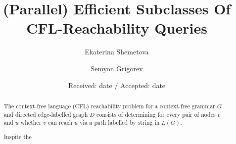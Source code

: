 \documentclass[smallextended]{svjour3}       %
\begin{document}
\title{(Parallel) Efficient Subclasses Of CFL-Reachability Queries%
}


\author{Ekaterina Shemetova         \and
        Semyon Grigorev %
}



\date{Received: date / Accepted: date}


\maketitle

\begin{abstract}
The context-free language (CFL) reachability problem for a context-free grammar $G$ and directed edge-labelled graph $D$ consists of determining for every pair of nodes  $v$ and $u$ whether $v$ can reach $u$ via a path labelled by string in $L(G)$. 
\par
Inspite the 
\end{abstract}
\end{document}
